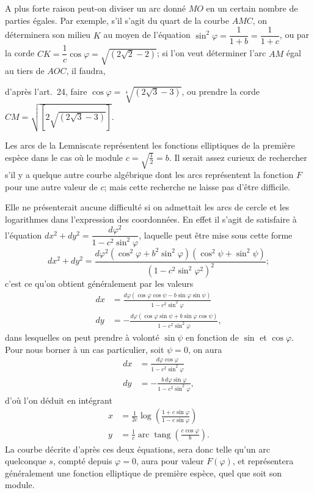 \documentclass{article}
\begin{document}
A plus forte raison peut-on diviser un arc donné $MO$ en un certain nombre de parties égales. Par exemple, s'il s'agit du quart de la courbe $AMC$, on déterminera son milieu $K$ au moyen de l'équation $\sin^{2}\varphi=\dfrac{1}{1+b}=\dfrac{1}{1+c}$, ou par la corde $CK=\dfrac{1}{c}\cos\varphi=\sqrt{(2\sqrt{2}-2)}$; si l'on veut déterminer l'arc $AM$ égal au tiers de $AOC$, il faudra,

d'après l'art.\ 24, faire $\cos\varphi=\sqrt[4]{(2\sqrt{3}-3)}$, ou prendre la corde $CM=\sqrt{[2\sqrt{(2\sqrt{3}-3)}]}$.

Les arcs de la Lemniscate représentent les fonctions elliptiques de la première espèce dans le cas où le module $c=\sqrt{\frac{1}{2}}=b$. Il serait assez curieux de rechercher s'il y a quelque autre courbe algébrique dont les arcs représentent la fonction $F$ pour une autre valeur de $c$; mais cette recherche ne laisse pas d'être difficile.

Elle ne présenterait aucune difficulté si on admettait les arcs de cercle et les logarithmes dans l'expression des coordonnées. En effet il s'agit de satisfaire à l'équation $dx^{2}+dy^{2}=\dfrac{d\varphi^{2}}{1-c^{2}\sin^{2}\varphi}$, laquelle peut être mise sous cette forme
\[ dx^{2}+dy^{2}=\frac{d\varphi^{2}(\cos^{2}\varphi+b^{2}\sin^{2}\varphi)(\cos^{2}\psi+\sin^{2}\psi)}{(1-c^{2}\sin^{2}\varphi^{2})^{2}}; \]
c'est ce qu'on obtient généralement par les valeurs
\[ \begin{aligned} dx &= \frac{d\varphi(\cos\varphi\cos\psi-b\sin\varphi\sin\psi)}{1-c^{2}\sin^{2}\varphi} \\ dy &= -\frac{d\varphi(\cos\varphi\sin\psi+b\sin\varphi\cos\psi)}{1-c^{2}\sin^{2}\varphi}, \end{aligned} \]
dans lesquelles on peut prendre à volonté $\sin\psi$ en fonction de $\sin$ et $\cos\varphi$. Pour nous borner à un cas particulier, soit $\psi=0$, on aura
\[ \begin{aligned} dx &= \frac{d\varphi\cos\varphi}{1-c^{2}\sin^{2}\varphi} \\ dy &= -\frac{b\,d\varphi\sin\varphi}{1-c^{2}\sin^{2}\varphi}, \end{aligned} \]
d'où l'on déduit en intégrant
\[ \begin{aligned} x &= \frac{1}{2c}\log\left(\frac{1+c\sin\varphi}{1-c\sin\varphi}\right) \\ y &= \frac{1}{c}\operatorname{arc}\operatorname{tang}\left(\frac{c\cos\varphi}{b}\right). \end{aligned} \]
La courbe décrite d'après ces deux équations, sera donc telle qu'un arc quelconque $s$, compté depuis $\varphi=0$, aura pour valeur $F(\varphi)$, et représentera généralement une fonction elliptique de première espèce, quel que soit son module.
\end{document}

